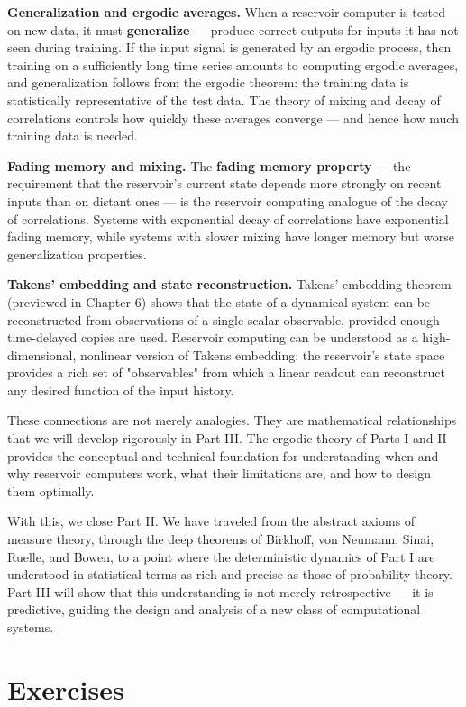 \textbf{Generalization and ergodic averages.} When a reservoir computer is tested on new data, it must \textbf{generalize} --- produce correct outputs for inputs it has not seen during training. If the input signal is generated by an ergodic process, then training on a sufficiently long time series amounts to computing ergodic averages, and generalization follows from the ergodic theorem: the training data is statistically representative of the test data. The theory of mixing and decay of correlations controls how quickly these averages converge --- and hence how much training data is needed.

\textbf{Fading memory and mixing.} The \textbf{fading memory property} --- the requirement that the reservoir's current state depends more strongly on recent inputs than on distant ones --- is the reservoir computing analogue of the decay of correlations. Systems with exponential decay of correlations have exponential fading memory, while systems with slower mixing have longer memory but worse generalization properties.

\textbf{Takens' embedding and state reconstruction.} Takens' embedding theorem (previewed in Chapter 6) shows that the state of a dynamical system can be reconstructed from observations of a single scalar observable, provided enough time-delayed copies are used. Reservoir computing can be understood as a high-dimensional, nonlinear version of Takens embedding: the reservoir's state space provides a rich set of "observables" from which a linear readout can reconstruct any desired function of the input history.

These connections are not merely analogies. They are mathematical relationships that we will develop rigorously in Part III. The ergodic theory of Parts I and II provides the conceptual and technical foundation for understanding when and why reservoir computers work, what their limitations are, and how to design them optimally.

With this, we close Part II. We have traveled from the abstract axioms of measure theory, through the deep theorems of Birkhoff, von Neumann, Sinai, Ruelle, and Bowen, to a point where the deterministic dynamics of Part I are understood in statistical terms as rich and precise as those of probability theory. Part III will show that this understanding is not merely retrospective --- it is predictive, guiding the design and analysis of a new class of computational systems.


\section*{Exercises}

